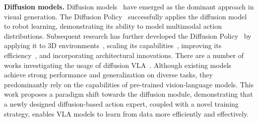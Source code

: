 \textbf{Diffusion models.} Diffusion models~\cite{chen2024yilun,peebles2023scalable,ho2020denoising} have emerged as the dominant approach in visual generation. The Diffusion Policy~\cite{diffusion-policy} successfully applies the diffusion model to robot learning, demonstrating its ability to model multimodal action distributions. Subsequent research has further developed the Diffusion Policy~\cite{aloha_unleashed, wang2024sparse-dp, prasad2024consistencypolicy, multimodal_diffusion_transformer, uehara2024fine, uehara2024feedback, black2023training, black2023zero, dasari2024ingredients, lin2024datascalinglawsimitation, dppo, wang2024inference, liu2022compositional} by applying it to 3D environments~\cite{3d_diffuser_actor, ze20243d, ze2024generalizable, yan2024dnact}, scaling its capabilities~\cite{scaledp}, improving its efficiency~\cite{mail-dp,prasad2024consistencypolicy}, and incorporating architectural innovations. There are a number of works investigating the usage of diffusion VLA~\cite{wen2024tinyvla, [pi0, wen2024diffusionvla}. Although existing models achieve strong performance and generalization on diverse tasks, they predominantly rely on the capabilities of pre-trained vision-language models. This work proposes a paradigm shift towards the diffusion module, demonstrating that a newly designed diffusion-based action expert, coupled with a novel training strategy, enables VLA models to learn from data more efficiently and effectively.
